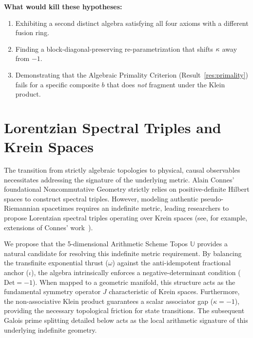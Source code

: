\textbf{What would kill these hypotheses:}
\begin{enumerate}[noitemsep]
  \item Exhibiting a second distinct algebra satisfying all four axioms with a different fusion ring.
  \item Finding a block-diagonal-preserving re-parametrization that shifts $\kappa$ away from $-1$.
  \item Demonstrating that the Algebraic Primality Criterion (Result~\ref{res:primality}) fails for a specific composite $b$ that does \emph{not} fragment under the Klein product.
\end{enumerate}




\section{Lorentzian Spectral Triples and Krein Spaces}
\label{sec:krein_connes}

The transition from strictly algebraic topologies to physical, causal observables necessitates addressing the signature of the underlying metric. Alain Connes' foundational Noncommutative Geometry strictly relies on positive-definite Hilbert spaces to construct spectral triples. However, modeling authentic pseudo-Riemannian spacetimes requires an indefinite metric, leading researchers to propose Lorentzian spectral triples operating over Krein spaces (see, for example, extensions of Connes' work~\cite{ConnesLorentzian}).

We propose that the 5-dimensional Arithmetic Scheme Topos $\mathbb{U}$ provides a natural candidate for resolving this indefinite metric requirement. By balancing the transfinite exponential thrust ($\omega$) against the anti-idempotent fractional anchor ($\iota$), the algebra intrinsically enforces a negative-determinant condition ($\text{Det} = -1$). When mapped to a geometric manifold, this structure acts as the fundamental symmetry operator $J$ characteristic of Krein spaces. Furthermore, the non-associative Klein product guarantees a scalar associator gap ($\kappa = -1$), providing the necessary topological friction for state transitions. The subsequent Galois prime splitting detailed below acts as the local arithmetic signature of this underlying indefinite geometry.



